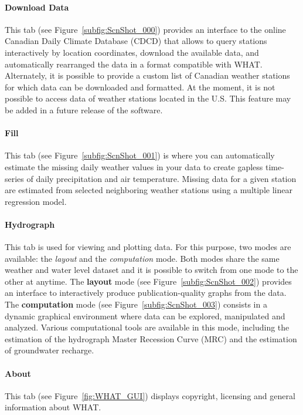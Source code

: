 \documentclass[12pt, letterpaper, fleqn]{report}
\begin{document}
\paragraph{Download Data} This tab (see Figure~\ref{subfig:ScnShot_000}) provides an interface to the online Canadian Daily Climate Database (CDCD) that allows to query stations interactively by location coordinates, download the available data, and automatically rearranged the data in a format compatible with WHAT. Alternately, it is possible to provide a custom list of Canadian weather stations for which data can be downloaded and formatted. At the moment, it is not possible to access data of weather stations located in the U.S. This feature may be added in a future release of the software.

\paragraph{Fill} This tab (see Figure~\ref{subfig:ScnShot_001}) is where you can automatically estimate the missing daily weather values in your data to create gapless time-series of daily precipitation and air temperature. Missing data for a given station are estimated from selected neighboring weather stations using a multiple linear regression model.

\paragraph{Hydrograph} This tab is used for viewing and plotting data. For this purpose, two modes are available: the \emph{layout} and the \emph{computation} mode. Both modes share the same weather and water level dataset and it is possible to switch from one mode to the other at anytime. The \textbf{layout} mode (see Figure~\ref{subfig:ScnShot_002}) provides an interface to interactively produce publication-quality graphs from the data. The \textbf{computation} mode (see Figure~\ref{subfig:ScnShot_003}) consists in a dynamic graphical environment where data can be explored, manipulated and analyzed. Various computational tools are available in this mode, including the estimation of the hydrograph Master Recession Curve (MRC) and the estimation of groundwater recharge.

\paragraph{About} This tab (see Figure~\ref{fig:WHAT_GUI}) displays copyright, licensing and general information about WHAT.
\end{document}
